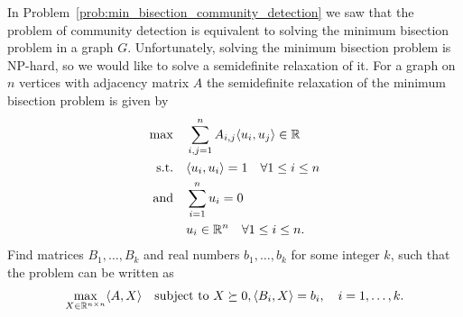 \begin{myexercise}
    \label{prob:min_bisection_relaxation}
    
    In Problem~\ref{prob:min_bisection_community_detection} we saw that the problem of community detection is equivalent to solving the minimum bisection problem in a graph $G$. Unfortunately, solving the minimum bisection problem is NP-hard, so we would like to solve a semidefinite relaxation of it. For a graph on $n$ vertices with adjacency matrix $A$ the semidefinite relaxation of the minimum bisection problem is given by 
    \begin{align*}
        \max \quad & \sum_{i,j=1}^n A_{i,j} \langle u_i, u_j \rangle  \in \mathbb{R}\\
        \text{s.t.}\quad &\langle u_i, u_i \rangle =1 \quad \forall 1 \leq i \leq n  \\
        \text{and} \quad &\sum_{i=1}^n u_{i} = 0 \\
        &u_i \in \mathbb{R}^n \quad \forall 1 \leq i \leq n.
    \end{align*}
    Find matrices $B_1, \ldots, B_k$ and real numbers $b_1, \ldots, b_k$ for some integer $k$, such that the problem can be written as
    \begin{equation}\label{eq:SDP_bisection}
        \max_{X\in \mathbb{R}^{n\times n}} \langle A, X \rangle \quad \text{subject to } X \succeq 0, \langle B_i, X \rangle = b_i,\quad i = 1, \dots, k.
    \end{equation}
\end{myexercise}

